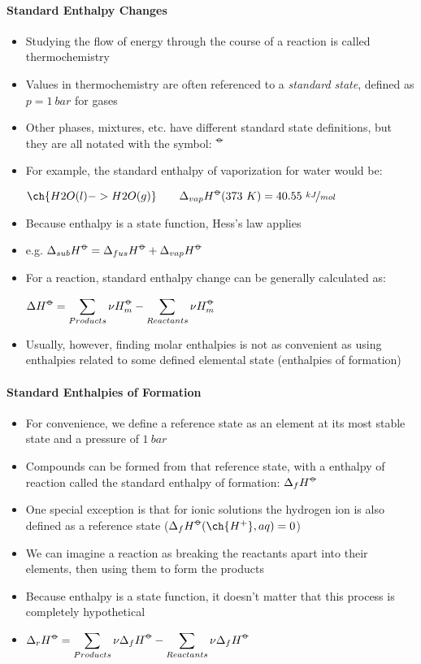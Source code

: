 \documentclass[12pt, openany, letterpaper]{memoir}
\begin{document}
\paragraph{Standard Enthalpy Changes}
\begin{itemize}
	\item Studying the flow of energy through the course of a reaction is called thermochemistry
	\item Values in thermochemistry are often referenced to a \emph{standard state}, defined as $p=1~bar$ for gases
	\item Other phases, mixtures, etc. have different standard state definitions, but they are all notated with the symbol: $^{\std}$
	\item For example, the standard enthalpy of vaporization for water would be:

	      $\ch{H2O(l) -> H2O(g)} \hspace{2em} \Delta_{vap}H^{\std}(373~K) = 40.55~\nicefrac{kJ}{mol}$
	\item Because enthalpy is a state function, Hess's law applies
	\item e.g. $\Delta_{sub}H^{\std} = \Delta_{fus}H^{\std} + \Delta_{vap}H^{\std}$
	\item For a reaction, standard enthalpy change can be generally calculated as:

	      $\Delta H^{\std} = \displaystyle\sum\limits_{Products}\nu H^{\std}_m - \displaystyle\sum\limits_{Reactants} \nu H^{\std}_m$
	\item Usually, however, finding molar enthalpies is not as convenient as using enthalpies related to some defined elemental state (enthalpies of formation)
\end{itemize}
\paragraph{Standard Enthalpies of Formation}
\begin{itemize}
	\item For convenience, we define a reference state as an element at its most stable state and a pressure of $1~bar$
	\item Compounds can be formed from that reference state, with a enthalpy of reaction called the standard enthalpy of formation: $\Delta_fH^{\std}$
	\item One special exception is that for ionic solutions the hydrogen ion is also defined as a reference state ($\Delta_f H^{\std}(\ch{H^+}, aq) =0$)
	\item We can imagine a reaction as breaking the reactants apart into their elements, then using them to form the products
	\item Because enthalpy is a state function, it doesn't matter that this process is completely hypothetical
	\item $\Delta_rH^{\std}=\displaystyle\sum\limits_{Products}\nu \Delta_fH^{\std} - \displaystyle\sum\limits_{Reactants}\nu\Delta_fH^{\std}$
\end{itemize}
\end{document}
